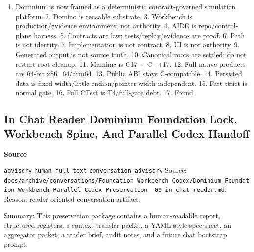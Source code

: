 \documentclass[9pt,a4paper,openany]{book}
\newcommand{\vonecallout}[3]{\par\medskip\noindent\begingroup\setlength{\fboxsep}{7pt}\colorbox{DomCalloutBg}{\parbox{0.94\linewidth}{\textbf{\textcolor{#1}{#2}}\par #3}}\endgroup\par\medskip}
\begin{document}
\begin{enumerate}
\item Dominium is now framed as a deterministic contract-\allowbreak{}governed simulation platform.\allowbreak{} 2.\allowbreak{} Domino is reusable substrate.\allowbreak{} 3.\allowbreak{} Workbench is production/\allowbreak{}evidence environment, not authority.\allowbreak{} 4.\allowbreak{} AIDE is repo/\allowbreak{}control-\allowbreak{}plane harness.\allowbreak{} 5.\allowbreak{} Contracts are law; tests/\allowbreak{}replay/\allowbreak{}evidence are proof.\allowbreak{} 6.\allowbreak{} Path is not identity.\allowbreak{} 7.\allowbreak{} Implementation is not contract.\allowbreak{} 8.\allowbreak{} UI is not authority.\allowbreak{} 9.\allowbreak{} Generated output is not source truth.\allowbreak{} 10.\allowbreak{} Canonical roots are settled; do not restart root cleanup.\allowbreak{} 11.\allowbreak{} Mainline is C17 + C++17.\allowbreak{} 12.\allowbreak{} Full native products are 64-\allowbreak{}bit x86\_\allowbreak{}64/\allowbreak{}arm64.\allowbreak{} 13.\allowbreak{} Public ABI stays C-\allowbreak{}compatible.\allowbreak{} 14.\allowbreak{} Persisted data is fixed-\allowbreak{}width/\allowbreak{}little-\allowbreak{}endian/\allowbreak{}pointer-\allowbreak{}width independent.\allowbreak{} 15.\allowbreak{} Fast strict is normal gate.\allowbreak{} 16.\allowbreak{} Full CTest is T4/\allowbreak{}full-\allowbreak{}gate debt.\allowbreak{} 17.\allowbreak{} Found
\end{enumerate}


\subsection{In Chat Reader Dominium Foundation Lock, Workbench Spine, And Parallel Codex Handoff}

\vonecallout{DomSlate}{Source}{\texttt{advisory} \texttt{human\_\allowbreak{}full\_\allowbreak{}text} \texttt{conversation\_\allowbreak{}advisory} Source: \texttt{docs/\allowbreak{}archive/\allowbreak{}conversations/\allowbreak{}Foundation\_\allowbreak{}Workbench\_\allowbreak{}Codex/\allowbreak{}Dominium\_\allowbreak{}Foundation\_\allowbreak{}Workbench\_\allowbreak{}Parallel\_\allowbreak{}Codex\_\allowbreak{}Preservation\_\allowbreak{}\_\allowbreak{}09\_\allowbreak{}in\_\allowbreak{}chat\_\allowbreak{}reader.\allowbreak{}md}.\allowbreak{} Reason: reader-\allowbreak{}oriented conversation artifact.\allowbreak{}}

Summary: This preservation package contains a human-\allowbreak{}readable report, structured registers, a context transfer packet, a YAML-\allowbreak{}style spec sheet, an aggregator packet, a reader brief, audit notes, and a future chat bootstrap prompt.\allowbreak{}
\end{document}
